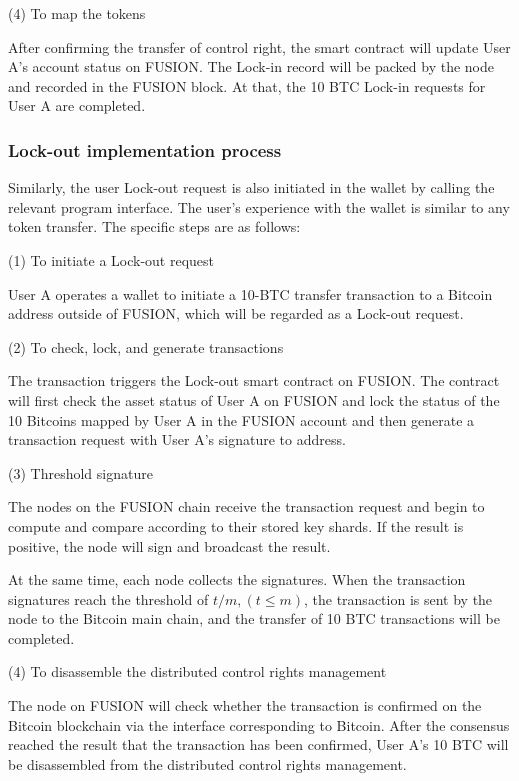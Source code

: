 \documentclass[a4paper,12pt]{article}
\begin{document}
(4) To map the tokens

After confirming the transfer of control right, the smart contract will update User A's account status on FUSION. The Lock-in record will be packed by the node and recorded in the FUSION block. At that, the 10 BTC Lock-in requests for User A are completed.

\subsubsection{Lock-out implementation process}

Similarly, the user Lock-out request is also initiated in the wallet by calling the relevant program interface. The user's experience with the wallet is similar to any token transfer. The specific steps are as follows:

(1) To initiate a Lock-out request 

User A operates a wallet to initiate a 10-BTC transfer transaction to a Bitcoin address outside of FUSION, which will be regarded as a Lock-out request.

(2) To check, lock, and generate transactions

The transaction triggers the Lock-out smart contract on FUSION. The contract will first check the asset status of User A on FUSION and lock the status of the 10 Bitcoins mapped by User A in the FUSION account and then generate a transaction request with User A's signature to address.

(3) Threshold signature

The nodes on the FUSION chain receive the transaction request and begin to compute and compare according to their stored key shards. If the result is positive, the node will sign and broadcast the result.

At the same time, each node collects the signatures. When the transaction signatures reach the threshold of $t/m, \left (t \le m \right)$, the transaction is sent by the node to the Bitcoin main chain, and the transfer of 10 BTC transactions will be completed.

(4) To disassemble the distributed control rights management

The node on FUSION will check whether the transaction is confirmed on the Bitcoin blockchain via the interface corresponding to Bitcoin. After the consensus reached the result that the transaction has been confirmed, User A's 10 BTC will be disassembled from the distributed control rights management.
\end{document}

